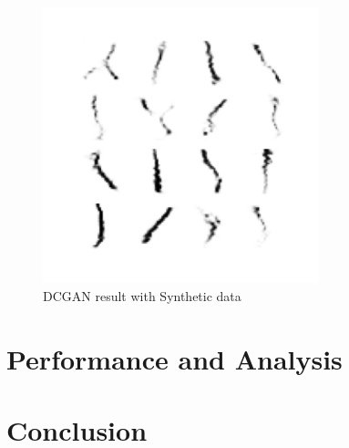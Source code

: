 \documentclass{article}
\begin{document}
\begin{figure}[H]
    \centering
    \includegraphics[width=8cm]{images/GAN/DCGANmodified.png}
    \caption{DCGAN result with Synthetic data}
\end{figure}
\section{Performance and Analysis}



\section{Conclusion}
\end{document}
